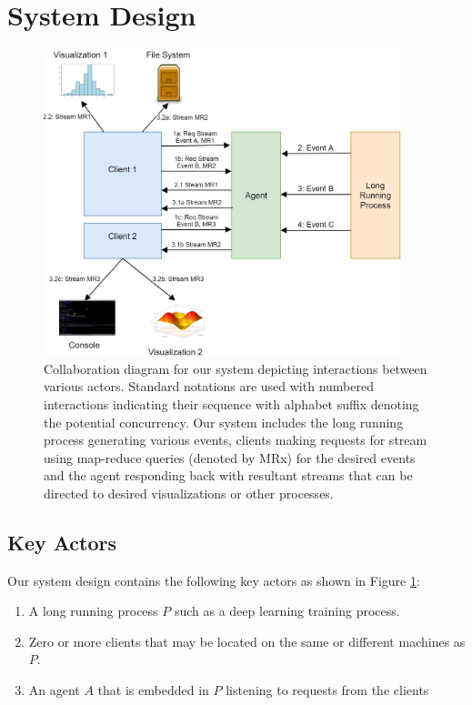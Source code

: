 \documentclass[sigchi]{acmart} %
\begin{document}
\section{System Design}

\begin{figure}[h]
  \centering
  \includegraphics[height=3.5in]{TensorWatch_Collaboration}
  \caption{Collaboration diagram for our system depicting interactions between various actors. Standard notations are used with numbered interactions indicating their sequence with alphabet suffix denoting the potential concurrency. Our system includes the long running process generating various events, clients making requests for stream using map-reduce queries (denoted by MRx) for the desired events and the agent responding back with resultant streams that can be directed to desired visualizations or other processes.}
  \label{fig:TensorWatch_Collaboration}
\end{figure}

\subsection{Key Actors}
Our system design contains the following key actors as shown in Figure \ref{fig:TensorWatch_Collaboration}:
\begin{enumerate}
  \item A long running process $P$ such as a deep learning training process.
  \item Zero or more clients that may be located on the  same or different machines as $P$.
  \item An agent $A$ that is embedded in $P$ listening to requests from the clients
\end{enumerate}
\end{document}

